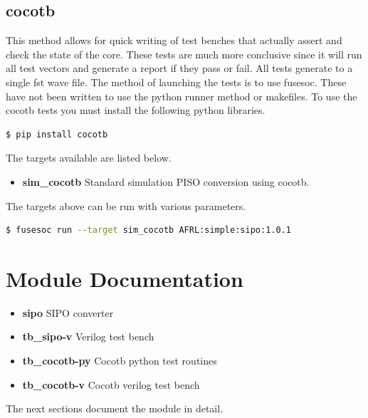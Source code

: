 \subsection{cocotb}
\par
This method allows for quick writing of test benches that actually assert and check the state of the core.
These tests are much more conclusive since it will run all test vectors and generate a report if they
pass or fail. All tests generate to a single fst wave file. The method of launching the tests is to use
fusesoc. These have not been written to use the python runner method or makefiles.
To use the cocotb tests you must install the following python libraries.
\begin{lstlisting}[language=bash]
  $ pip install cocotb
\end{lstlisting}

The targets available are listed below.
\begin{itemize}
  \item \textbf{sim\_cocotb} Standard simulation PISO conversion using cocotb.
\end{itemize}

The targets above can be run with various parameters.
\begin{lstlisting}[language=bash]
  $ fusesoc run --target sim_cocotb AFRL:simple:sipo:1.0.1
\end{lstlisting}

\newpage

\section{Module Documentation} \label{Module Documentation}

\par

\begin{itemize}
\item \textbf{sipo} SIPO converter\\
\item \textbf{tb\_sipo-v} Verilog test bench\\
\item \textbf{tb\_cocotb-py} Cocotb python test routines\\
\item \textbf{tb\_cocotb-v} Cocotb verilog test bench\\
\end{itemize}
The next sections document the module in detail.

